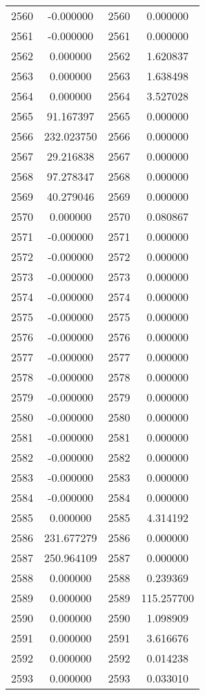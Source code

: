 \documentclass[12pt]{article}
\begin{document}
\begin{longtable}{@{}cccc@{}}
2560 & -0.000000 & 2560 & 0.000000 \\
2561 & -0.000000 & 2561 & 0.000000 \\
2562 & 0.000000 & 2562 & 1.620837 \\
2563 & 0.000000 & 2563 & 1.638498 \\
2564 & 0.000000 & 2564 & 3.527028 \\
2565 & 91.167397 & 2565 & 0.000000 \\
2566 & 232.023750 & 2566 & 0.000000 \\
2567 & 29.216838 & 2567 & 0.000000 \\
2568 & 97.278347 & 2568 & 0.000000 \\
2569 & 40.279046 & 2569 & 0.000000 \\
2570 & 0.000000 & 2570 & 0.080867 \\
2571 & -0.000000 & 2571 & 0.000000 \\
2572 & -0.000000 & 2572 & 0.000000 \\
2573 & -0.000000 & 2573 & 0.000000 \\
2574 & -0.000000 & 2574 & 0.000000 \\
2575 & -0.000000 & 2575 & 0.000000 \\
2576 & -0.000000 & 2576 & 0.000000 \\
2577 & -0.000000 & 2577 & 0.000000 \\
2578 & -0.000000 & 2578 & 0.000000 \\
2579 & -0.000000 & 2579 & 0.000000 \\
2580 & -0.000000 & 2580 & 0.000000 \\
2581 & -0.000000 & 2581 & 0.000000 \\
2582 & -0.000000 & 2582 & 0.000000 \\
2583 & -0.000000 & 2583 & 0.000000 \\
2584 & -0.000000 & 2584 & 0.000000 \\
2585 & 0.000000 & 2585 & 4.314192 \\
2586 & 231.677279 & 2586 & 0.000000 \\
2587 & 250.964109 & 2587 & 0.000000 \\
2588 & 0.000000 & 2588 & 0.239369 \\
2589 & 0.000000 & 2589 & 115.257700 \\
2590 & 0.000000 & 2590 & 1.098909 \\
2591 & 0.000000 & 2591 & 3.616676 \\
2592 & 0.000000 & 2592 & 0.014238 \\
2593 & 0.000000 & 2593 & 0.033010 \\

\end{longtable}
\end{document}
